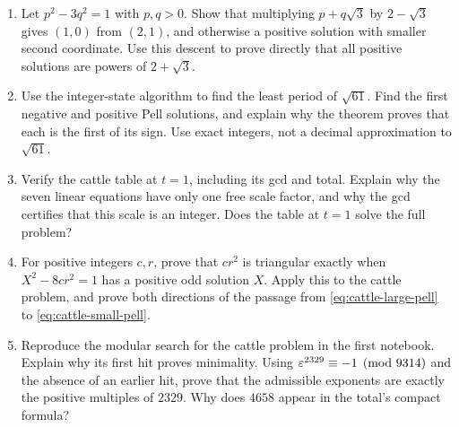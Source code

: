 \begin{exercisebox}
\begin{enumerate}
  \item Let $p^2-3q^2=1$ with $p,q>0$. Show that multiplying
  $p+q\sqrt3$ by $2-\sqrt3$ gives $(1,0)$ from $(2,1)$,
  and otherwise a positive solution with smaller second coordinate.
  Use this descent to prove directly that all positive solutions are
  powers of $2+\sqrt3$. 
  \item Use the integer-state algorithm to find the least period of
  $\sqrt{61}$. Find the first negative and positive Pell solutions,
  and explain why the theorem proves that each is the first of its
  sign. Use exact integers, not a decimal approximation to $\sqrt{61}$.
  \item Verify the cattle table at $t=1$, including its gcd and total.
  Explain why the seven linear equations have only one free scale
  factor, and why the gcd certifies that this scale is an integer.
  Does the table at $t=1$ solve the full problem? 
  \item For positive integers $c,r$, prove that $cr^2$ is triangular
  exactly when $X^2-8cr^2=1$ has a positive odd solution $X$.
  Apply this to the cattle problem, and prove both directions of the
  passage from \eqref{eq:cattle-large-pell} to
  \eqref{eq:cattle-small-pell}. 
  \item Reproduce the modular search for the cattle problem in the
  first notebook. Explain why its first hit proves minimality. Using
  $\varepsilon^{2329}\equiv-1\pmod{9314}$ and the absence of an
  earlier hit, prove that the admissible exponents are exactly the
  positive multiples of $2329$. Why does $4658$ appear in the total's
  compact formula? 
\end{enumerate}
\end{exercisebox}
